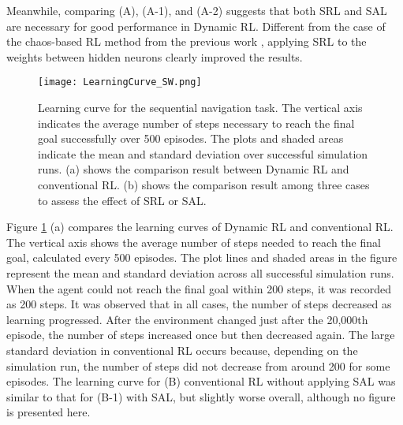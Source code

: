 Meanwhile, comparing (A), (A-1), and (A-2) suggests that both SRL and SAL are necessary
for good performance in Dynamic RL.
Different from the case of the chaos-based RL method from the previous work \citep{IJCNN2015},
applying SRL to the weights between hidden neurons clearly improved the results.

\begin{figure}[ht]
\centerline{\texttt{[image: LearningCurve\_SW.png]}}
\caption{Learning curve for the sequential navigation task. The vertical axis indicates the average number of steps
necessary to reach the final goal successfully over 500 episodes. The plots and shaded areas indicate the mean and standard deviation
over successful simulation runs.
(a) shows the comparison result between Dynamic RL and conventional RL.
(b) shows the comparison result among three cases to assess the effect of SRL or SAL.}
\label{fig:LearningCurve_SW}
\end{figure}
Figure \ref{fig:LearningCurve_SW} (a) compares the learning curves of Dynamic RL and conventional RL.
The vertical axis shows the average number of steps needed to reach the final goal,
calculated every 500 episodes.
The plot lines and shaded areas in the figure represent the mean and standard deviation
across all successful simulation runs.
When the agent could not reach the final goal within 200 steps, it was recorded as 200 steps.
It was observed that in all cases, the number of steps decreased as learning progressed.
After the environment changed just after the 20,000th episode, the number of steps increased once
but then decreased again.
The large standard deviation in conventional RL occurs because,
depending on the simulation run, the number of steps did not decrease from around 200 for some episodes.
The learning curve for (B) conventional RL without applying SAL was similar to that for (B-1) with SAL,
but slightly worse overall, although no figure is presented here.

